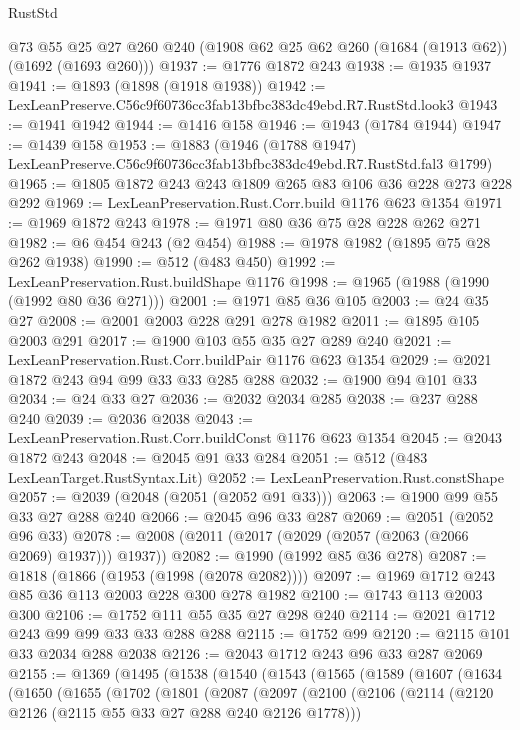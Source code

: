\begin{lexlean}{RustStd}
\begin{coremodule}
    @73
    @55
    @25
    @27
    @260
    @240
    (@1908 @62 @25 @62 @260 (@1684 (@1913 @62)) (@1692 (@1693 @260)))
@1937 := @1776 @1872 @243
@1938 := @1935 @1937
@1941 := @1893 (@1898 (@1918 @1938))
@1942 := LexLeanPreserve.C56c9f60736cc3fab13bfbc383dc49ebd.R7.RustStd.look3
@1943 := @1941 @1942
@1944 := @1416 @158
@1946 := @1943 (@1784 @1944)
@1947 := @1439 @158
@1953 := @1883
    (@1946 (@1788 @1947) LexLeanPreserve.C56c9f60736cc3fab13bfbc383dc49ebd.R7.RustStd.fal3 @1799)
@1965 := @1805 @1872 @243 @243 @1809 @265 @83 @106 @36 @228 @273 @228 @292
@1969 := LexLeanPreservation.Rust.Corr.build @1176 @623 @1354
@1971 := @1969 @1872 @243
@1978 := @1971 @80 @36 @75 @28 @228 @262 @271
@1982 := @6 @454 @243 (@2 @454)
@1988 := @1978 @1982 (@1895 @75 @28 @262 @1938)
@1990 := @512 (@483 @450)
@1992 := LexLeanPreservation.Rust.buildShape @1176
@1998 := @1965 (@1988 (@1990 (@1992 @80 @36 @271)))
@2001 := @1971 @85 @36 @105
@2003 := @24 @35 @27
@2008 := @2001 @2003 @228 @291 @278 @1982
@2011 := @1895 @105 @2003 @291
@2017 := @1900 @103 @55 @35 @27 @289 @240
@2021 := LexLeanPreservation.Rust.Corr.buildPair @1176 @623 @1354
@2029 := @2021 @1872 @243 @94 @99 @33 @33 @285 @288
@2032 := @1900 @94 @101 @33
@2034 := @24 @33 @27
@2036 := @2032 @2034 @285
@2038 := @237 @288 @240
@2039 := @2036 @2038
@2043 := LexLeanPreservation.Rust.Corr.buildConst @1176 @623 @1354
@2045 := @2043 @1872 @243
@2048 := @2045 @91 @33 @284
@2051 := @512 (@483 LexLeanTarget.RustSyntax.Lit)
@2052 := LexLeanPreservation.Rust.constShape
@2057 := @2039 (@2048 (@2051 (@2052 @91 @33)))
@2063 := @1900 @99 @55 @33 @27 @288 @240
@2066 := @2045 @96 @33 @287
@2069 := @2051 (@2052 @96 @33)
@2078 := @2008 (@2011 (@2017 (@2029 (@2057 (@2063 (@2066 @2069) @1937))) @1937))
@2082 := @1990 (@1992 @85 @36 @278)
@2087 := @1818 (@1866 (@1953 (@1998 (@2078 @2082))))
@2097 := @1969 @1712 @243 @85 @36 @113 @2003 @228 @300 @278 @1982
@2100 := @1743 @113 @2003 @300
@2106 := @1752 @111 @55 @35 @27 @298 @240
@2114 := @2021 @1712 @243 @99 @99 @33 @33 @288 @288
@2115 := @1752 @99
@2120 := @2115 @101 @33 @2034 @288 @2038
@2126 := @2043 @1712 @243 @96 @33 @287 @2069
@2155 := @1369
    (@1495
      (@1538
        (@1540
          (@1543
            (@1565
              (@1589
                (@1607
                  (@1634
                    (@1650
                      (@1655
                        (@1702
                          (@1801
                            (@2087
                              (@2097
                                (@2100
                                  (@2106
                                    (@2114 (@2120 @2126 (@2115 @55 @33 @27 @288 @240 @2126 @1778)))

\end{coremodule}
\end{lexlean}

